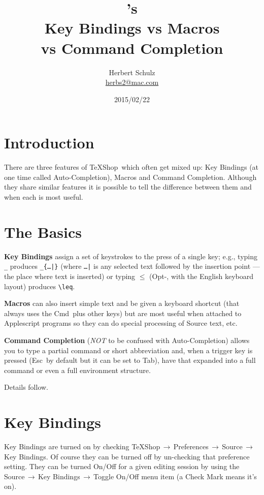 \documentclass[11pt]{article}
\title{\TS's\\Key Bindings vs Macros\\vs Command Completion}
\author{Herbert Schulz\\\small\href{mailto:herbs2@mac.com}{herbs2@mac.com}}
\date{2015/02/22}
\newcommand{\cmdkey}{\textsf{Cmd}}
\newcommand{\esckey}{\textsf{Esc}}
\newcommand{\tabkey}{\textsf{Tab}}
\newcommand{\mnu}[1]{\textsf{#1}}
\newcommand{\cmd}[1]{\textsf{#1}}
\newcommand{\To}{\,\(\to\)\,}
\newcommand{\TS}{\textsf{\TeX Shop}}
\begin{document}
\maketitle

\section{Introduction}

There are three features of \TS\ which often get mixed up: \cmd{Key Bindings} (at one time  called \cmd{Auto-Completion}), \cmd{Macros} and \cmd{Command Completion}. Although they share similar features it is possible to tell the difference between them and when each is most useful.

\section{The Basics}

\textbf{\cmd{Key Bindings}} assign a set of keystrokes to the press of a single key; e.g., typing \verb"_" produces \verb"_{…|}" (where \verb"…|" is any selected text followed by the insertion point --- the place where text is inserted) or typing \(\leq\) (\cmd{Opt-,} with the English keyboard layout) produces \verb"\leq".

\noindent\textbf{\cmd{Macros}} can also insert simple text and be given a keyboard shortcut (that always uses the \cmdkey\ plus other keys) but are most useful when attached to Applescript programs so they can do special processing of Source text, etc.

\noindent\textbf{\cmd{Command Completion}} (\emph{NOT} to be confused with \cmd{Auto-Completion}) allows you to type a partial command or short abbreviation and, when a trigger key is pressed (\esckey\ by default but it can be set to \tabkey), have that expanded into a full command or even a full environment structure.

Details follow.

\section{\cmd{Key Bindings}}

\cmd{Key Bindings} are turned on by checking \mnu{TeXShop}\To\mnu{Preferences}\To\mnu{Source}\To\mnu{Key Bindings}. Of course they can be turned off by un-checking that preference setting. They can be turned On/Off for a given editing session by using the \mnu{Source}\To\mnu{Key Bindings}\To\mnu{Toggle On/Off} menu item (a Check Mark means it's on).
\end{document}
